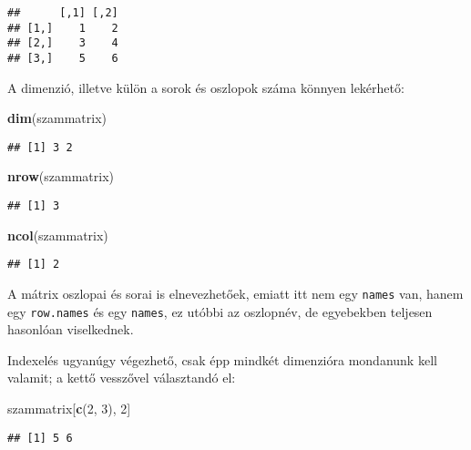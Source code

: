 \documentclass[
]{book}
\newenvironment{Shaded}{\begin{snugshade}}{\end{snugshade}}
\newcommand{\DecValTok}[1]{\textcolor[rgb]{0.00,0.00,0.81}{#1}}
\newcommand{\KeywordTok}[1]{\textcolor[rgb]{0.13,0.29,0.53}{\textbf{#1}}}
\newcommand{\NormalTok}[1]{#1}
\begin{document}
\begin{verbatim}
##      [,1] [,2]
## [1,]    1    2
## [2,]    3    4
## [3,]    5    6
\end{verbatim}

A dimenzió, illetve külön a sorok és oszlopok száma könnyen lekérhető:

\begin{Shaded}
\begin{Highlighting}[]
\KeywordTok{dim}\NormalTok{(szammatrix)}
\end{Highlighting}
\end{Shaded}

\begin{verbatim}
## [1] 3 2
\end{verbatim}

\begin{Shaded}
\begin{Highlighting}[]
\KeywordTok{nrow}\NormalTok{(szammatrix)}
\end{Highlighting}
\end{Shaded}

\begin{verbatim}
## [1] 3
\end{verbatim}

\begin{Shaded}
\begin{Highlighting}[]
\KeywordTok{ncol}\NormalTok{(szammatrix)}
\end{Highlighting}
\end{Shaded}

\begin{verbatim}
## [1] 2
\end{verbatim}

A mátrix oszlopai és sorai is elnevezhetőek, emiatt itt nem egy \texttt{names} van, hanem egy \texttt{row.names} és egy \texttt{names}, ez utóbbi az oszlopnév, de egyebekben teljesen hasonlóan viselkednek.

Indexelés ugyanúgy végezhető, csak épp mindkét dimenzióra mondanunk kell valamit; a kettő vesszővel választandó el:

\begin{Shaded}
\begin{Highlighting}[]
\NormalTok{szammatrix[}\KeywordTok{c}\NormalTok{(}\DecValTok{2}\NormalTok{, }\DecValTok{3}\NormalTok{), }\DecValTok{2}\NormalTok{]}
\end{Highlighting}
\end{Shaded}

\begin{verbatim}
## [1] 5 6
\end{verbatim}
\end{document}
